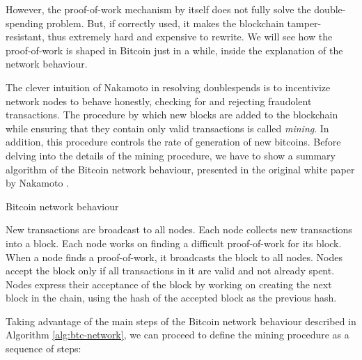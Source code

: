 \bigskip
\noindent
However, the proof-of-work mechanism by itself does not fully solve the double-spending problem. But, if correctly used, it makes the blockchain tamper-resistant, thus extremely hard and expensive to rewrite. We will see how the proof-of-work is shaped in Bitcoin just in a while, inside the explanation of the network behaviour.

\bigskip
\noindent
The clever intuition of Nakamoto in resolving doublespends is to incentivize network nodes to behave honestly, checking for and rejecting fraudolent transactions. The procedure by which new blocks are added to the blockchain while ensuring that they contain only valid transactions is called \textit{mining}. In addition, this procedure controls the rate of generation of new bitcoins. Before delving into the details of the mining procedure, we have to show a summary algorithm of the Bitcoin network behaviour, presented in the original white paper by Nakamoto \cite{nakamoto2012bitcoin}.

\begin{algorithm}
	\caption{Bitcoin network behaviour}
	\label{alg:btc-network}
	\begin{algorithmic}[1]
		\State New transactions are broadcast to all nodes.
		\State Each node collects new transactions into a block.
		\State Each node works on finding a difficult proof-of-work for its block.
		\State When a node finds a proof-of-work, it broadcasts the block to all nodes.
		\State Nodes accept the block only if all transactions in it are valid and not already spent.
		\State  Nodes express their acceptance of the block by working on creating the next block in the chain, using the hash of the accepted block as the previous hash.
	\end{algorithmic}
\end{algorithm}

\bigskip
\noindent
Taking advantage of the main steps of the Bitcoin network behaviour described in Algorithm \ref{alg:btc-network}, we can proceed to define the mining procedure as a sequence of steps:

